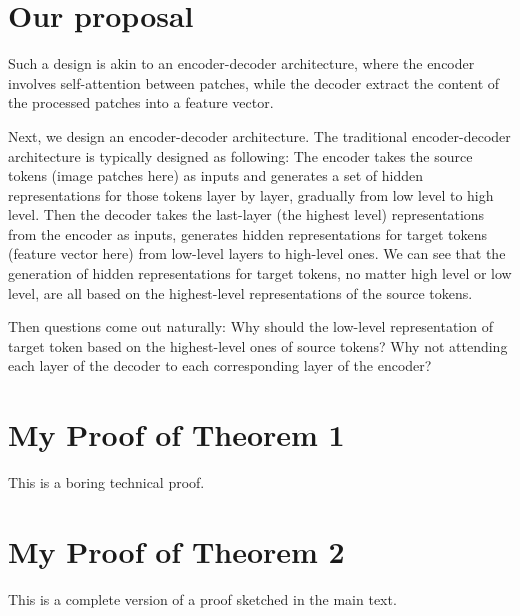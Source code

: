 \documentclass[anon,12pt]{colt2024} %
\begin{document}
\section{Our proposal}

Such a design is akin to an encoder-decoder architecture, where the encoder involves self-attention between patches, while the decoder extract the content of the processed patches into a feature vector.



Next, we design an encoder-decoder architecture.
The traditional encoder-decoder architecture is typically designed as following:
The encoder takes the source tokens (image patches here) as inputs and generates a set of hidden representations for those tokens layer by layer, gradually from low level to high level. Then the decoder takes the last-layer (the highest level) representations from the encoder as inputs, generates hidden representations for target tokens (feature vector here) from low-level layers to high-level ones.
We can see that the generation of hidden representations for target tokens, no matter high level or low level, are all based on the highest-level representations of the source tokens.

Then questions come out naturally: Why should the low-level representation of target token based on the highest-level ones of source tokens? Why not attending each layer of the decoder to each corresponding layer of the encoder?




\appendix


\section{My Proof of Theorem 1}

This is a boring technical proof.

\section{My Proof of Theorem 2}

This is a complete version of a proof sketched in the main text.
\end{document}
